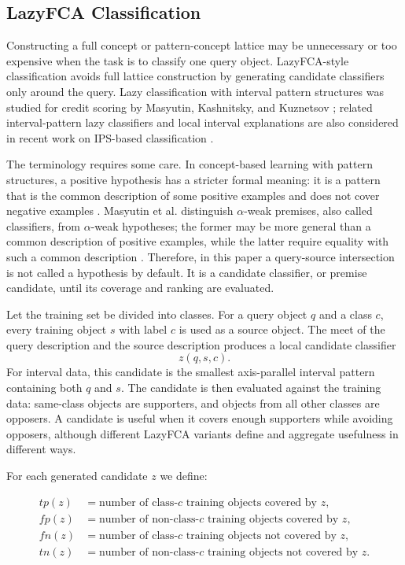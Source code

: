 \documentclass[11pt]{article}
\begin{document}
\subsection{LazyFCA Classification}

Constructing a full concept or pattern-concept lattice may be unnecessary or
too expensive when the task is to classify one query object. LazyFCA-style
classification avoids full lattice construction by generating candidate
classifiers only around the query. Lazy classification with interval pattern
structures was
studied for credit scoring by Masyutin, Kashnitsky, and Kuznetsov
\cite{masyutin2015lazy}; related interval-pattern lazy classifiers and local
interval explanations are also considered in recent work on IPS-based
classification \cite{TOMAT2026109754}.

The terminology requires some care. In concept-based learning with pattern
structures, a positive hypothesis has a stricter formal meaning: it is a
pattern that is the common description of some positive examples and does not
cover negative examples \cite{kuznetsov2009pattern,kuznetsov2013fitting}.
Masyutin et al. distinguish $\alpha$-weak premises, also called classifiers,
from $\alpha$-weak hypotheses; the former may be more general than a common
description of positive examples, while the latter require equality with such a
common description \cite{masyutin2015lazy}. Therefore, in this paper a
query-source intersection is not called a hypothesis by default. It is a
candidate classifier, or premise candidate, until its coverage and ranking are
evaluated.

Let the training set be divided into classes. For a query object $q$ and a
class $c$, every training object $s$ with label $c$ is used as a source object.
The meet of the query description and the source description produces a local
candidate classifier
\[
    z(q,s,c).
\]
For interval data, this candidate is the smallest axis-parallel interval
pattern containing both $q$ and $s$. The candidate is then evaluated against
the training data: same-class objects are supporters, and objects from all
other classes are opposers. A candidate is useful when it covers enough
supporters while avoiding opposers, although different LazyFCA variants define
and aggregate usefulness in different ways.

For each generated candidate $z$ we define:

\begin{align*}
tp(z) &= \text{number of class-}c\text{ training objects covered by }z,\\
fp(z) &= \text{number of non-class-}c\text{ training objects covered by }z,\\
fn(z) &= \text{number of class-}c\text{ training objects not covered by }z,\\
tn(z) &= \text{number of non-class-}c\text{ training objects not covered by }z.
\end{align*}
\end{document}
